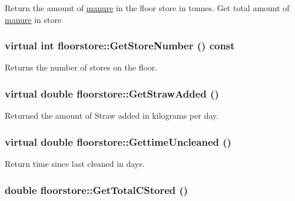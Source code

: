 Return the amount of \hyperlink{classmanure}{manure} in the floor store in tonnes. Get total amount of \hyperlink{classmanure}{manure} in store \hypertarget{classfloorstore_a5222c3797cf8a2f443ab387478e9946d}{
\subsubsection[{GetStoreNumber}]{\setlength{\rightskip}{0pt plus 5cm}virtual int floorstore::GetStoreNumber () const}}
\label{classfloorstore_a5222c3797cf8a2f443ab387478e9946d}


Returns the number of stores on the floor. \hypertarget{classfloorstore_a90e0034ad69a88d43933153640ec7661}{
\subsubsection[{GetStrawAdded}]{\setlength{\rightskip}{0pt plus 5cm}virtual double floorstore::GetStrawAdded ()}}
\label{classfloorstore_a90e0034ad69a88d43933153640ec7661}


Returned the amount of Straw added in kilograms per day. \hypertarget{classfloorstore_a93f174dcbbf14e77c16d482dbb46a464}{
\subsubsection[{GettimeUncleaned}]{\setlength{\rightskip}{0pt plus 5cm}virtual double floorstore::GettimeUncleaned ()}}
\label{classfloorstore_a93f174dcbbf14e77c16d482dbb46a464}


Return time since last cleaned in days. \hypertarget{classfloorstore_af6c7892c3ec1811e49d62c9875987792}{
\subsubsection[{GetTotalCStored}]{\setlength{\rightskip}{0pt plus 5cm}double floorstore::GetTotalCStored ()}}
\label{classfloorstore_af6c7892c3ec1811e49d62c9875987792}


